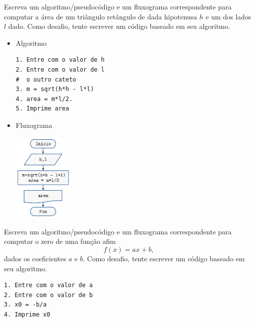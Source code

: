 \begin{exer}
  Escreva um algoritmo/pseudocódigo e um fluxograma correspondente para computar a área de um triângulo retângulo de dada hipotenusa $h$ e um dos lados $l$ dado. Como desafio, tente escrever um código {\python} baseado em seu algoritmo.
\end{exer}
\begin{resp}
  \begin{itemize}
    \item Algoritmo

\begin{verbatim}
1. Entre com o valor de h
2. Entre com o valor de l
#  o outro cateto
3. m = sqrt(h*h - l*l)
4. area = m*l/2.
5. Imprime area
\end{verbatim}

\item Fluxograma

\includegraphics[width=1.15in]{./cap_lingua/dados/fig_resp_triaRet/fig.png}

  \end{itemize}
\end{resp}

\begin{exer}
  Escreva um algoritmo/pseudocódigo e um fluxograma correspondente para computar o zero de uma função afim
  \begin{equation}
    f(x) = ax + b,
  \end{equation}
  dados os coeficientes $a$ e $b$. Como desafio, tente escrever um código {\python} baseado em seu algoritmo.
\end{exer}
\begin{resp}

\begin{verbatim}
1. Entre com o valor de a
2. Entre com o valor de b
3. x0 = -b/a
4. Imprime x0
\end{verbatim}
  
\end{resp}  

